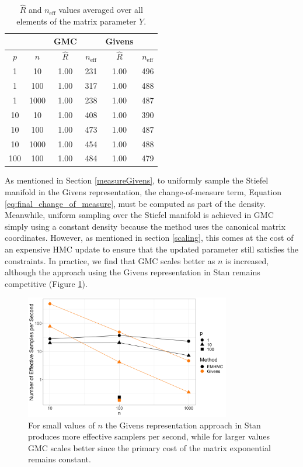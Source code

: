 \documentclass[ba]{imsart}
\numberwithin{equation}{section}
\theoremstyle{plain}
\begin{document}
\begin{table}
\begin{tabular}{|cc||cc|cc|}
\hline
& & GMC & & Givens &\\
\hline
$p$ & $n$  & $\hat{R}$ & $n_{\mathrm{eff}}$ & $\hat{R}$ & $n_{\mathrm{eff}}$\\
\hline
\hline
1 & 10 & 1.00 & 231 & 1.00 & 496\\
1 & 100 & 1.00 & 317 & 1.00 & 488\\
1 & 1000 & 1.00 & 238 & 1.00 & 487 \\
\hline
10 & 10 & 1.00 & 408 & 1.00  & 390\\
10 & 100 & 1.00 & 473 & 1.00 & 487\\
10 & 1000 & 1.00 & 454 & 1.00  & 488 \\
\hline
100 & 100 & 1.00 & 484 & 1.00 & 479 \\
\hline
\end{tabular}
\caption{$\hat{R}$ and $n_{\mathrm{eff}}$ values averaged over all elements of the matrix parameter $Y$. }
\label{tab:rhat_neff}
\end{table}

\noindent As mentioned in Section \ref{measureGivens}, to uniformly sample the Stiefel manifold in the Givens representation, the change-of-measure term, Equation \ref{eq:final_change_of_measure}, must be computed as part of the density. Meanwhile, uniform sampling over the Stiefel manifold is achieved in GMC simply using a constant density because the method uses the canonical matrix coordinates. However, as mentioned in section \ref{scaling}, this comes at the cost of an expensive HMC update to ensure that the updated parameter still satisfies the constraints. In practice, we find that GMC scales better as $n$ is increased, although the approach using the Givens representation in Stan remains competitive (Figure \ref{fig:scaling}).

\begin{figure}[h]
\centering
\vspace{.1in}
\includegraphics[width=0.8\textwidth]{figures/scaling.png}
\vspace{.05in}
\caption{For small values of $n$ the Givens representation approach in Stan produces more effective samplers per second, while for larger values GMC scales better since the primary cost of the matrix exponential remains constant.}
\label{fig:scaling}
\end{figure}
\end{document}
